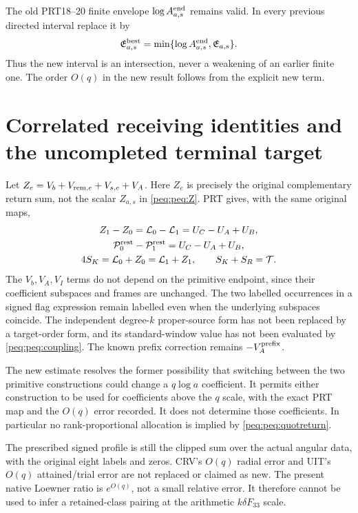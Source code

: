 \documentclass[11pt,a4paper]{article}
\begin{document}
The old PRT18--20 finite envelope $\log A^{\rm end}_{a,s}$ remains valid. In every previous directed interval replace it by
\begin{equation}
 \mathfrak E^{\rm best}_{a,s}
 =\min\{\log A^{\rm end}_{a,s},\mathfrak E_{a,s}\}.
 \label{peq:peq:intersection}
\end{equation}
Thus the new interval is an intersection, never a weakening of an earlier finite one. The order $O(q)$ in the new result follows from the explicit new term.

\section{Correlated receiving identities and the uncompleted terminal target}
Let $Z_e=V_b+V_{{\rm rem},e}+V_{s,e}+V_A$. Here $Z_e$ is precisely the original complementary return sum, not the scalar $Z_{a,s}$ in \eqref{peq:peq:Z}. PRT gives, with the same original maps,
\begin{equation}
\begin{gathered}
 Z_1-Z_0=\mathcal L_0-\mathcal L_1=U_C-U_A+U_B,\\
 \mathcal P^{\rm rest}_0-\mathcal P^{\rm rest}_1=U_C-U_A+U_B,\\
 4S_K=\mathcal L_0+Z_0=\mathcal L_1+Z_1,\qquad
 S_K+S_R=\mathcal T.
\end{gathered}\label{peq:peq:coupling}
\end{equation}
The $V_b,V_A,V_I$ terms do not depend on the primitive endpoint, since their coefficient subspaces and frames are unchanged. The two labelled occurrences in a signed flag expression remain labelled even when the underlying subspaces coincide. The independent degree-$k$ proper-source form has not been replaced by a target-order form, and its standard-window value has not been evaluated by \eqref{peq:peq:coupling}. The known prefix correction remains $-V_A^{\rm prefix}$.

The new estimate resolves the former possibility that switching between the two primitive constructions could change a $q\log a$ coefficient. It permits either construction to be used for coefficients above the $q$ scale, with the exact PRT map and the $O(q)$ error recorded. It does not determine those coefficients. In particular no rank-proportional allocation is implied by \eqref{peq:peq:quotreturn}.

The prescribed signed profile is still the clipped sum over the actual angular data, with the original eight labels and zeros. CRV's $O(q)$ radial error and UIT's $O(q)$ attained/trial error are not replaced or claimed as new. The present native Loewner ratio is $e^{O(q)}$, not a small relative error. It therefore cannot be used to infer a retained-class pairing at the arithmetic $k\delta F_{33}$ scale.
\end{document}
